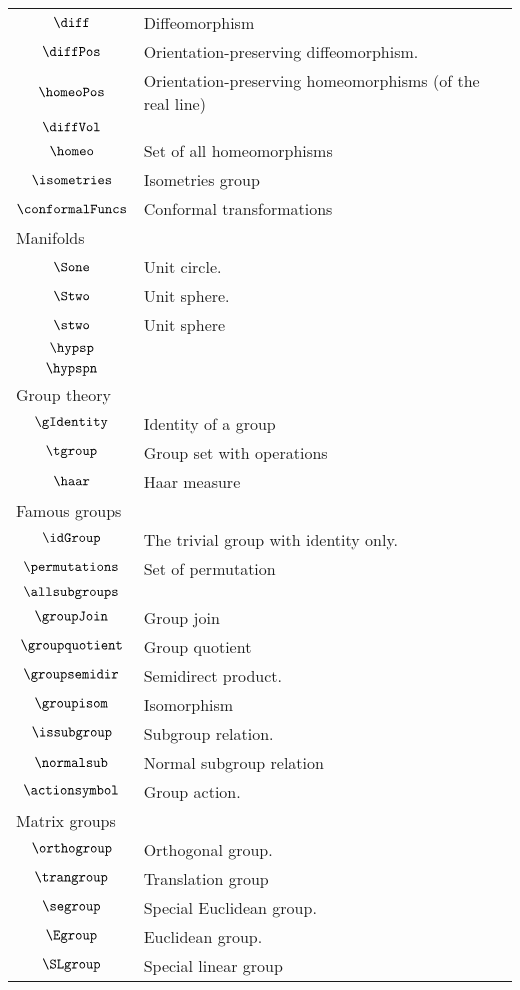 \begin{longtable}{cl}
 \hline
$\diff$ &  Diffeomorphism\\ 
 $\diffPos$ &  Orientation-preserving diffeomorphism.\\ 
 $\homeoPos$ &  Orientation-preserving homeomorphisms (of the real line)\\ 
 $\diffVol$ & \\ 
 $\homeo$ &  Set of all homeomorphisms\\ 
 $\isometries$ &  Isometries group\\ 
 $\conformalFuncs$ &  Conformal transformations\\ 
 \multicolumn{2}{l}{Manifolds}\\ 
 \hline
$\Sone$ &  Unit circle.\\ 
 $\Stwo$ &  Unit sphere.\\ 
 $\stwo$ &  Unit sphere\\ 
 $\hypsp$ & \\ 
 $\hypspn$ & \\ 
 \multicolumn{2}{l}{Group theory}\\ 
 \hline
$\gIdentity$ &  Identity of a group\\ 
 $\tgroup$ &  Group set with operations\\ 
 $\haar$ &  Haar measure\\ 
 \multicolumn{2}{l}{Famous groups}\\ 
 \hline
$\idGroup$ &  The trivial group with identity only.\\ 
 $\permutations$ &  Set of permutation\\ 
 $\allsubgroups$ & \\ 
 $\groupJoin$ &  Group join\\ 
 $\groupquotient$ &  Group quotient\\ 
 $\groupsemidir$ &  Semidirect product.\\ 
 $\groupisom$ &  Isomorphism\\ 
 $\issubgroup$ &  Subgroup relation.\\ 
 $\normalsub$ &  Normal subgroup relation\\ 
 $\actionsymbol$ &  Group action.\\ 
 \multicolumn{2}{l}{Matrix groups}\\ 
 \hline
$\orthogroup$ &  Orthogonal group.\\ 
 $\trangroup$ &   Translation group\\ 
 $\segroup$ &  Special Euclidean group.\\ 
 $\Egroup$ &   Euclidean group.\\ 
 $\SLgroup$ &   Special linear group\\ 

\end{longtable}
